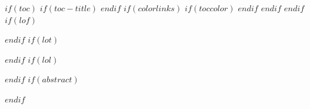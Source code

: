 $if(toc)$
$if(toc-title)$
\renewcommand*\contentsname{$toc-title$}
$endif$
{
$if(colorlinks)$
$if(toccolor)$
\hypersetup{linkcolor=$toccolor$}
$endif$
$endif$
\setcounter{tocdepth}{$toc-depth$}
\tableofcontents
\thispagestyle{oxfordtransfer}
}
\clearpage
$endif$
$if(lof)$
\renewcommand*\listfigurename{List of Figures}
\listoffigures
\thispagestyle{oxfordtransfer}
\clearpage
$endif$
$if(lot)$
\renewcommand*\listtablename{List of Tables}
\listoftables
\thispagestyle{oxfordtransfer}
\clearpage
$endif$
$if(lol)$
\renewcommand*\lstlistlistingname{Listings}
\lstlistoflistings
\thispagestyle{oxfordtransfer}
\clearpage
$endif$
$if(abstract)$
\clearpage
\thispagestyle{empty}
\begin{abstract}
$abstract$
$if(keywords)$

$endif$
\end{abstract}
\clearpage
$endif$
